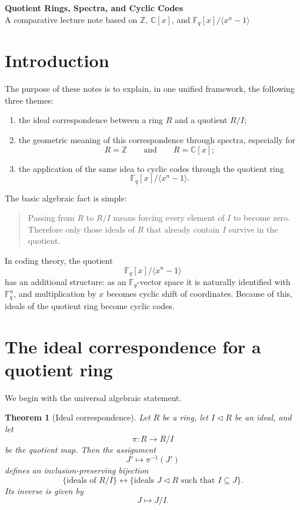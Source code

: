 \documentclass[11pt]{article}
\newtheorem{theorem}{Theorem}[section]
\theoremstyle{definition}
\newcommand{\Z}{\mathbb{Z}}
\newcommand{\C}{\mathbb{C}}
\newcommand{\F}{\mathbb{F}}
\newcommand{\ideal}[1]{\langle #1\rangle}
\begin{document}
	
	\begin{center}
		{\LARGE \textbf{Quotient Rings, Spectra, and Cyclic Codes}}\\[0.5em]
		{\large A comparative lecture note based on $\Z$, $\C[x]$, and $\F_q[x]/\ideal{x^n-1}$}
	\end{center}
	
	\tableofcontents
	
	\section{Introduction}
	
	The purpose of these notes is to explain, in one unified framework, the following three themes:
	
	\begin{enumerate}[label=\textbf{(\arabic*)}]
		\item the ideal correspondence between a ring \(R\) and a quotient \(R/I\);
		
		\item the geometric meaning of this correspondence through spectra, especially for
		\[
		R=\Z
		\qquad\text{and}\qquad
		R=\C[x];
		\]
		
		\item the application of the same idea to cyclic codes through the quotient ring
		\[
		\F_q[x]/\ideal{x^n-1}.
		\]
	\end{enumerate}
	
	The basic algebraic fact is simple:
	
	\begin{quote}
		Passing from \(R\) to \(R/I\) means forcing every element of \(I\) to become zero.
		Therefore only those ideals of \(R\) that already contain \(I\) survive in the quotient.
	\end{quote}
	
	In coding theory, the quotient
	\[
	\F_q[x]/\ideal{x^n-1}
	\]
	has an additional structure: as an \(\F_q\)-vector space it is naturally identified with \(\F_q^n\), and multiplication by \(x\) becomes cyclic shift of coordinates. Because of this, ideals of the quotient ring become cyclic codes.
	
	\section{The ideal correspondence for a quotient ring}
	
	We begin with the universal algebraic statement.
	
	\begin{theorem}[Ideal correspondence]\label{thm:ideal-correspondence}
		Let \(R\) be a ring, let \(I\triangleleft R\) be an ideal, and let
		\[
		\pi:R\to R/I
		\]
		be the quotient map. Then the assignment
		\[
		J' \longmapsto \pi^{-1}(J')
		\]
		defines an inclusion-preserving bijection
		\[
		\{\text{ideals of }R/I\}
		\longleftrightarrow
		\{\text{ideals }J\triangleleft R \text{ such that } I\subseteq J\}.
		\]
		Its inverse is given by
		\[
		J \longmapsto J/I.
		\]
	\end{theorem}
	
\end{document}
